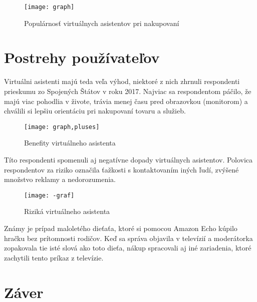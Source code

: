 \documentclass[10pt,twoside,slovak,coursepaper]{article}
\begin{document}
\begin{figure}[H]
 \centering
 \texttt{[image: graph]}
\caption {Populárnosť virtuálnych asistentov pri nakupovaní \cite{iKinsella}}
\end{figure}

\section{Postrehy používateľov}

Virtuálni asistenti majú teda veľa výhod, niektoré z nich zhrnuli respondenti prieskumu zo Spojených Štátov v roku 2017.\cite{Nae} Najviac sa respondentom páčilo, že majú viac pohodlia v živote, trávia menej času pred obrazovkou (monitorom) a chválili si lepšiu orientáciu pri nakupovaní tovaru a služieb.

\begin{figure}[H]
\centering
\texttt{[image: graph,pluses]}
\caption{Benefity virtuálneho asistenta\cite{iNae}}
\end{figure}
Títo respondenti spomenuli aj negatívne dopady virtuálnych asistentov. Polovica respondentov za riziko označila ťažkosti s kontaktovaním iných ľudí, zvýšené množstvo reklamy a nedorozumenia.\cite{Nae}

\begin{figure}[H]
\centering
\texttt{[image: -graf]}
\caption{Riziká virtuálneho asistenta \cite{iNae}}
\end{figure}

Známy je prípad maloletého dieťaťa, ktoré si pomocou Amazon Echo kúpilo hračku bez prítomnosti rodičov. Keď sa správa objavila v televízií a moderátorka zopakovala tie isté slová ako toto dieťa, nákup spracovali aj iné zariadenia, ktoré zachytili tento príkaz z televízie.



\section{Záver}




\end{document}
